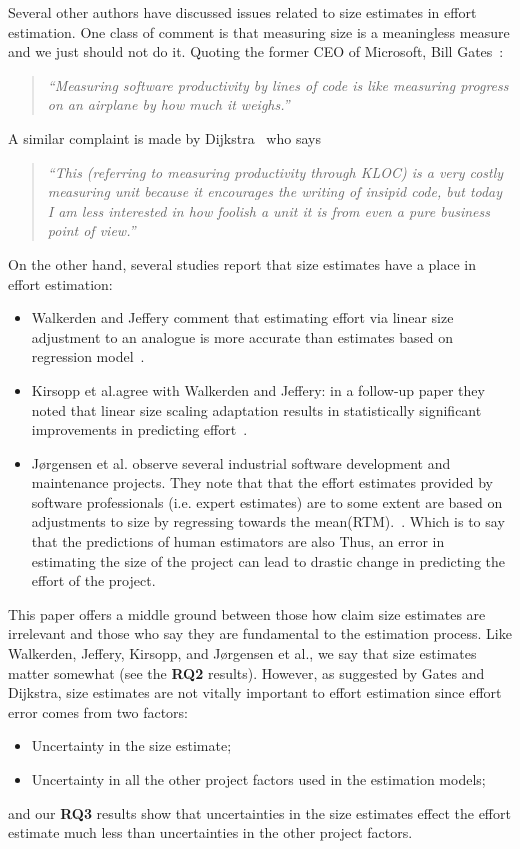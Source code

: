 \documentclass[final,twocolumn]{elsarticle}
\newcommand{\etal}{et al.}
\newcommand{\bi}{\begin{itemize}[leftmargin=0.4cm]}
\newcommand{\ei}{\end{itemize}}
\theoremstyle{break}
\begin{document}
Several other authors have discussed issues related to size estimates in effort
estimation.  One class of comment is that measuring size is a meaningless
measure and we just should not do it.  Quoting the former CEO of Microsoft, Bill
Gates~\cite{goll04}:
\begin{quote}{\em ``Measuring software productivity by lines of code is
  like measuring progress on an airplane by how much it weighs.''}\end{quote}
A similar
complaint is made by Dijkstra~\cite{dij88} who says\begin{quote}
{\em ``This (referring to
  measuring productivity through KLOC) is a very costly measuring unit because it
  encourages the writing of insipid code, but today I am less interested in how
  foolish a unit it is from even a pure business point of view.''}
  \end{quote}
On the other hand, several studies report that size estimates have a place in
effort estimation:
\bi
\item
Walkerden and Jeffery comment that estimating effort via linear size
adjustment to an analogue is more accurate than estimates based on regression
model~\cite{Walkerden1999}.
\item
  Kirsopp \etal agree with Walkerden and Jeffery: in a follow-up paper
they noted that  linear size scaling adaptation results in statistically
significant improvements in predicting
effort~\cite{kirsopp2003empirical}.
\item  J{\o}rgensen  et al. observe several industrial software development and
maintenance projects. They note that  that the effort estimates provided by software
professionals (i.e. expert estimates) are to some extent are based on adjustments
to size by regressing towards the mean(RTM).~\cite{jorgensen2003software}. Which is to say
that the predictions of human estimators are also Thus, an error in estimating the size
of the project can lead to drastic change in predicting the effort of the
project.
\ei
This paper offers a  middle ground between those how claim size estimates are irrelevant and those
who say they are fundamental to the estimation process.
 Like Walkerden, Jeffery, Kirsopp, and J{\o}rgensen  et al., we say that size estimates matter somewhat (see the {\bf RQ2} results).
 However, as suggested by Gates and Dijkstra, size estimates are   not vitally important to effort estimation
 since effort error comes from two factors:
 \bi
\item Uncertainty in the size estimate;
\item Uncertainty in all the other project factors used in the estimation models;
  \ei
  and our {\bf RQ3} results show that
  uncertainties in the size estimates effect the effort estimate much less than uncertainties in the other project factors.
  
\end{document}
